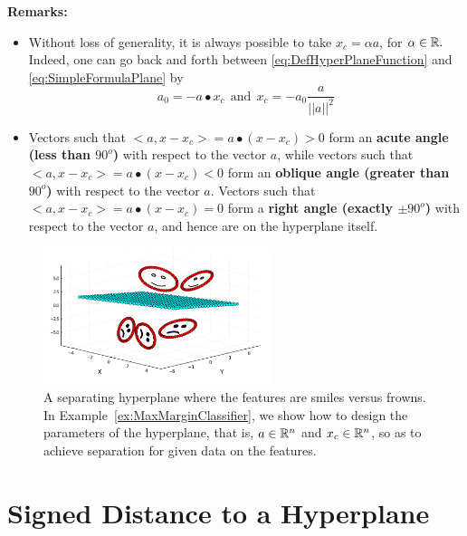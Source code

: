 \textbf{Remarks:} 
\begin{itemize}
\item Without loss of generality, it is always possible to take $x_c = \alpha a$, for $\alpha \in \mathbb R.$ Indeed, one can go back and forth between \eqref{eq:DefHyperPlaneFunction} and \eqref{eq:SimpleFormulaPlane} by
  \begin{equation}
      \label{eq:HyperplaneEquivalentFormulas}
      a_0 = - a \bullet x_c~~\text{and}~~x_c = - a_0 \frac{a}{||a||^2}
  \end{equation}
  \item Vectors such that $<a,  x-x_c > = a \bullet (x-x_c) > 0$ form an \textbf{acute angle (less than $90^o$)} with respect to the vector $a$, while vectors such that $<a,  x-x_c > = a \bullet (x-x_c) < 0$ form an \textbf{oblique angle (greater than $90^o$)} with respect to the vector $a$. Vectors such that $<a,  x-x_c > = a \bullet (x-x_c) = 0$ form a \textbf{right angle (exactly $\pm 90^o$)} with respect to the vector $a$, and hence are on the hyperplane itself.
\end{itemize}

 \vspace*{0.2cm}
\begin{figure}[hbt!]
\centering
\includegraphics[width=0.6\textwidth]{graphics/Chap13SeparatingHyperplanes/SeparatingHyperPlaneSmileFrown.png}
\caption[]{A separating hyperplane where the features are smiles versus frowns. In Example~\ref{ex:MaxMarginClassifier}, we show how to design the parameters of the hyperplane, that is,  $a\in \mathbb R^n$ and $x_c \in \mathbb R^n$, so as to achieve separation for given data on the features.} 
\label{fig:SeparatingHyperplane}
\end{figure}

\section{Signed Distance to a Hyperplane}
\label{sec:SignedDistance}


